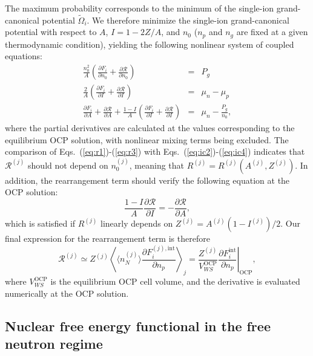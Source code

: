 The maximum probability corresponds to the minimum of the single-ion
grand-canonical potential $\tilde{\Omega}_{i}$. We therefore minimize the 
single-ion grand-canonical potential with respect to $A$, $I=1-2Z/A$, and 
$n_0$ ($n_p$ and $n_g$ are fixed at a given thermodynamic condition), yielding 
the following nonlinear system of coupled equations:
%
\begin{eqnarray}
  \frac{n_0^2}{A}\left(\frac{\partial F_i}{\partial n_0} + \frac{\partial
  \mathcal{R}}{\partial n_0}\right) &=& P_g\label{eq:r1}\\
  \frac{2}{A}\left(\frac{\partial F_i}{\partial I} + \frac{\partial
  \mathcal{R}}{\partial I}\right) &=& \mu_n - \mu_p\label{eq:r2}\\
  \frac{\partial F_i}{\partial A} + \frac{\partial \mathcal{R}}{\partial A} +
  \frac{1-I}{A}\left(\frac{\partial F_i}{\partial I} + \frac{\partial
  \mathcal{R}}{\partial I}\right) &=& \mu_n - \frac{P_g}{n_0},\label{eq:r3}
\end{eqnarray}
%
where the partial derivatives are calculated at the values corresponding to 
the equilibrium OCP solution, with nonlinear mixing terms being excluded.
%
The comparison of Eqs.~(\ref{eq:r1})-(\ref{eq:r3}) with
Eqs.~(\ref{eq:ic2})-(\ref{eq:ic4}) indicates that $\mathcal{R}^{(j)}$ should 
not depend on $n_0^{(j)}$, meaning that $R^{(j)}=R^{(j)}(A^{(j)},Z^{(j)})$. In 
addition, the rearrangement term should verify the following equation at the 
OCP solution:
%
\begin{equation}
  \frac{1-I}{A}\frac{\partial \mathcal{R}}{\partial I} = -\frac{\partial
  \mathcal{R}}{\partial A},
\end{equation}
%
which is satisfied if $R^{(j)}$ linearly depends on 
$Z^{(j)} = A^{(j)} (1-I^{(j)})/2$. Our final expression for the rearrangement 
term is therefore
%
\begin{equation}
  \mathcal{R}^{(j)} \simeq Z^{(j)} \left\langle \langle n_N^{(j)}\rangle 
    \frac{\partial F_i^{(j),\text{int}}}{\partial n_p}\right\rangle_j
  = \frac{Z^{(j)}}{V_{WS}^{\text{OCP}}}
  \left.\frac{\partial F_i^{\text{int}}}{\partial
    n_p}\right|_{\text{OCP}},\label{eq:rear}
\end{equation}
%
where $V_{WS}^{\text{OCP}}$ is the equilibrium OCP cell volume, and the
derivative is evaluated numerically at the OCP solution.

\subsection{Nuclear free energy functional in the free neutron 
regime}\label{subsec:freeenfunctional}

